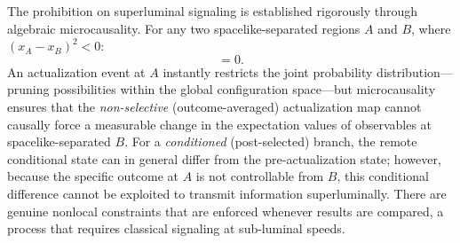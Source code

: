 \documentclass[11pt,a4paper]{article}
\theoremstyle{plain}
\theoremstyle{definition}
\theoremstyle{remark}
\begin{document}
The prohibition on superluminal signaling is established rigorously through
algebraic microcausality. For any two spacelike-separated regions $A$ and $B$,
where $(x_A - x_B)^2 < 0$:
\begin{equation}
  [\hat{O}_A,\,\hat{O}_B] = 0.
\end{equation}
An actualization event at $A$ instantly restricts the joint probability
distribution---pruning possibilities within the global configuration space---but
microcausality ensures that the \emph{non-selective} (outcome-averaged)
actualization map cannot causally force a measurable change in the expectation
values of observables at spacelike-separated $B$. For a \emph{conditioned}
(post-selected) branch, the remote conditional state can in general differ from the
pre-actualization state; however, because the specific outcome at $A$ is not
controllable from $B$, this conditional difference cannot be exploited to transmit
information superluminally. There are genuine nonlocal constraints that are
enforced whenever results are compared, a process that requires classical signaling
at sub-luminal speeds.
\end{document}
